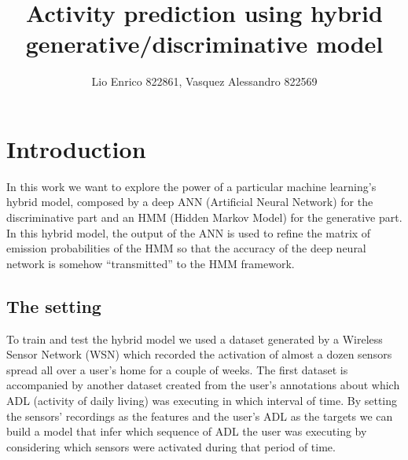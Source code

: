 \documentclass[10pt,a4paper]{article}
\title{Activity prediction using hybrid generative/discriminative model}
\author{Lio Enrico 822861, Vasquez Alessandro 822569}
\begin{document}
\maketitle
\newpage
\section{Introduction}
In this work we want to explore the power of a particular machine learning's hybrid model, composed by a deep ANN (Artificial Neural Network) for the discriminative part and an HMM (Hidden Markov Model) for the generative part. In this hybrid model, the output of the ANN is used to refine the matrix of emission probabilities of the HMM so that the accuracy of the deep neural network is somehow ``transmitted'' to the HMM framework.
\subsection{The setting}
To train and test the hybrid model we used a dataset generated by a Wireless Sensor Network (WSN) which recorded the activation of almost a dozen sensors spread all over a user's home for a couple of weeks. The first dataset is accompanied by another dataset created from the user's annotations about which ADL (activity of daily living) was executing in which interval of time. By setting the sensors' recordings as the features and the user's ADL as the targets we can build a model that infer which sequence of ADL the user was executing by considering which sensors were activated during that period of time. 
\end{document}
